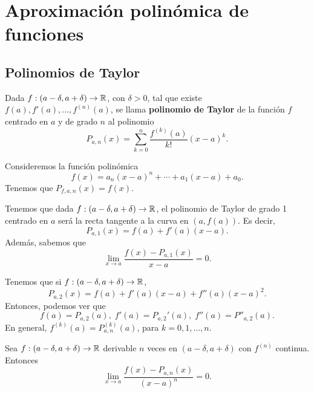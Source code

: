 \chapter{Aproximación polinómica de funciones}
\section{Polinomios de Taylor}
\begin{fdefinition}
\normalfont Dada $\displaystyle f : \left(a-\delta, a + \delta \right)\to \mathbb{R} $, con $\displaystyle \delta > 0 $, tal que existe $\displaystyle f\left(a\right), f'\left(a\right), \ldots, f^{\left(n\right)}\left(a\right) $, se llama \textbf{polinomio de Taylor} de la función $\displaystyle f $ centrado en $\displaystyle a $ y de grado $\displaystyle n $ al polinomio
\[P_{a,n}\left(x\right) = \sum^{n}_{k=0}\frac{f^{\left(k\right)}\left(a\right)}{k!}\left(x-a\right)^{k} .\]
\end{fdefinition}
\begin{eg}
\normalfont Consideremos la función polinómica
\[f\left(x\right) = a_{n}\left(x-a\right)^{n} + \cdots + a_{1}\left(x-a\right) + a_{0} .\]
Tenemos que $\displaystyle P_{f,a,n}\left(x\right) = f\left(x\right) $.
\end{eg}
\begin{observation}
\normalfont Tenemos que dada $\displaystyle f : \left(a-\delta, a + \delta \right)\to \mathbb{R} $, el polinomio de Taylor de grado 1 centrado en $\displaystyle a $ será la recta tangente a la curva en $\displaystyle \left(a,f\left(a\right)\right) $. Es decir,
\[P_{a,1}\left(x\right) = f\left(a\right) + f'\left(a\right)\left(x-a\right) .\]
Además, sabemos que
\[\lim_{x \to a}\frac{f\left(x\right)-P_{a,1}\left(x\right)}{x-a} = 0 .\]
\end{observation}
\begin{observation}
\normalfont Tenemos que si $\displaystyle f : \left(a-\delta, a + \delta \right)\to \mathbb{R} $, 
\[ P_{a,2}\left(x\right) = f\left(a\right) + f'\left(a\right)\left(x-a\right) + f''\left(a\right)\left(x-a\right)^{2} .\]
Entonces, podemos ver que
\[f\left(a\right) = P_{a,2}\left(a\right), \; f'\left(a\right) = P_{a,2}'\left(a\right), \; f''\left(a\right) = P''_{a,2}\left(a\right) .\]
En general, $\displaystyle f^{\left(k\right)}\left(a\right) = P^{\left(k\right)}_{a,n}\left(a\right) $, para $\displaystyle k = 0, 1, \ldots, n $.
\end{observation}
\begin{ftheorem}[]
\normalfont Sea $\displaystyle f: \left(a - \delta, a + \delta \right) \to \mathbb{R} $ derivable $\displaystyle n $ veces en $\displaystyle \left(a - \delta, a + \delta \right) $ con $\displaystyle f^{\left(n\right)} $ continua. Entonces
\[ \lim_{x \to a}\frac{f\left(x\right)-P_{a,n}\left(x\right)}{\left(x-a\right)^{n}} =0 .\]
\end{ftheorem}
